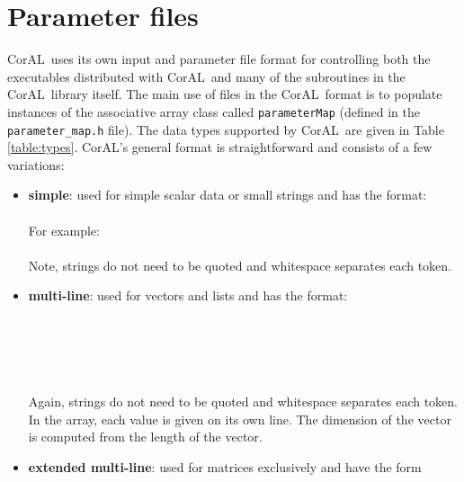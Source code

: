 \documentclass[10pt]{article}
\newcommand{\coral}{CorAL}
\begin{document}
\section{Parameter files}
\coral \ uses its own input and parameter file format for controlling both the executables distributed with \coral \ and many of the subroutines in the \coral \ library itself.  The main use of files in the \coral \ format is to populate instances of the associative array class called {\tt parameterMap} (defined in the {\tt parameter\_map.h} file).  The data types supported by \coral \ are given in Table \ref{table:types}.  \coral's general format is straightforward and consists of a few variations:
\begin{itemize}
	\item {\bf simple}: used for simple scalar data or small strings and has the format:\\
			\hspace*{0.25 in}{\tt type   name   value}\\
	For example:\\
			\\
	Note, strings do not need to be quoted and whitespace separates each token.
	\item {\bf multi-line}: used for vectors and lists and has the format:\\
			\\
			\hspace*{0.5 in}{\tt value0}\\
			\hspace*{0.5 in}{\tt value1}\\
			\hspace*{0.5 in}{\tt ...}\\
			\hspace*{0.25 in}{\tt \}}\\
	Again, strings do not need to be quoted and whitespace separates each token.  In the array, each value is given on its own line.  The dimension of the vector is computed from the length of the vector.
	\item {\bf extended multi-line}: used for matrices exclusively and have the form\\
			\\

\end{itemize}
\end{document}
